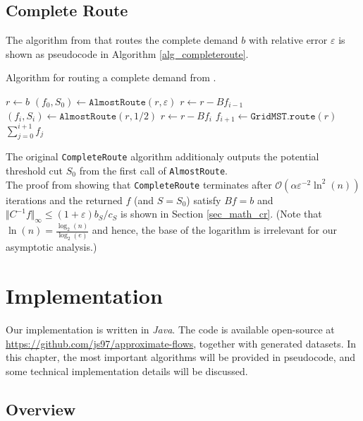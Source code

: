 \section{Complete Route}
The algorithm from \cite{nmfnlt} that routes the complete demand $b$ with relative error $\varepsilon$ is shown as pseudocode in Algorithm \ref{alg_completeroute}.
\begin{algorithm}
\caption{Algorithm for routing a complete demand from \cite{nmfnlt}.}\label{alg_completeroute}
\begin{algorithmic}[1]
\State $r\gets b$
\State $(f_0,S_0)\gets \texttt{AlmostRoute}(r,\varepsilon)$
  \State $r\gets r-Bf_{i-1}$
  \State $(f_i,S_i)\gets \texttt{AlmostRoute}(r, 1/2)$
\EndFor
\State $r\gets r-Bf_i$
\State $f_{i+1}\gets \texttt{GridMST.route}(r)$
\State \Return $\sum_{j=0}^{i+1}f_j$
\EndProcedure
\end{algorithmic}
\end{algorithm}

The original \texttt{CompleteRoute} algorithm additionaly outputs the potential threshold cut $S_0$ from the first call of \texttt{AlmostRoute}.\\
The proof from \cite{nmfnlt} showing that \texttt{CompleteRoute} terminates after $\mathcal{O}(\alpha\varepsilon^{-2}\ln^2(n))$ iterations and the returned $f$ (and $S=S_0$) satisfy $Bf=b$ and $\Vert C^{-1}f\Vert_\infty\leq (1+\varepsilon)b_S/c_S$ is shown in Section \ref{sec_math_cr}. (Note that $\ln(n)=\frac{\log_2(n)}{\log_2(e)}$ and hence, the base of the logarithm is irrelevant for our asymptotic analysis.)

\chapter{Implementation} 
\label{ImplChap}
Our implementation is written in \emph{Java}. The code is available open-source at \url{https://github.com/js97/approximate-flows}, together with generated datasets. In this chapter, the most important algorithms will be provided in pseudocode, and some technical implementation details will be discussed.

\section{Overview}

